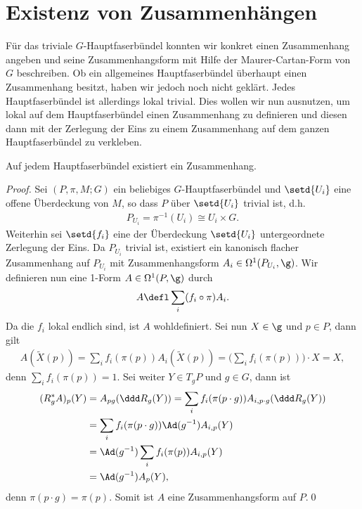 \documentclass[%
	paper=a5,%
	fleqn,%
	DIV=18,%
	BCOR=0mm,
	fontsize=11pt,
	titlepage=false,%
	bibliography=totoc,
	DIV=18,%
	twoside=true,
	pdftitle=Riemannsche Geometrie,
	pdfauthor=Uwe Semmelmann,
	numbers=noendperiod]%
	{scrbook}
\begin{document}
\section{Existenz von Zusammenhängen}

Für das triviale $G$-Hauptfaserbündel konnten wir konkret einen Zusammenhang
angeben und seine Zusammenhangsform mit Hilfe der Maurer-Cartan-Form von $G$
beschreiben. Ob ein allgemeines Hauptfaserbündel überhaupt einen Zusammenhang
besitzt, haben wir jedoch noch nicht geklärt. Jedes Hauptfaserbündel ist allerdings
lokal trivial. Dies wollen wir nun ausnutzen, um lokal auf dem
Hauptfaserbündel einen Zusammenhang zu definieren und diesen dann mit der
Zerlegung der Eins zu einem Zusammenhang auf dem ganzen Hauptfaserbündel zu
verkleben.

\begin{prop}
Auf jedem Hauptfaserbündel existiert ein Zusammenhang.\fish
\end{prop}
\begin{proof}
Sei $(P,\pi,M;G)$ ein beliebiges $G$-Hauptfaserbündel und $\setd{U_i}$ eine
offene Überdeckung von $M$, so dass $P$ über $\setd{U_i}$ trivial ist, d.h.
\begin{align*}
P_{U_i} = \pi^{-1}(U_i) \cong U_i \times G.
\end{align*}
Weiterhin sei $\setd{f_i}$ eine der Überdeckung $\setd{U_i}$ untergeordnete
Zerlegung der Eins. Da $P_{U_i}$ trivial ist, existiert ein kanonisch
flacher Zusammenhang auf $P_{U_i}$ mit Zusammenhangsform $A_i\in
\Omega^1(P_{U_i},\g)$. Wir definieren nun eine 1-Form $A\in\Omega^1(P,\g)$
durch
\begin{align*}
A\defl \sum_{i} (f_i\circ \pi) A_i.
\end{align*}
Da die $f_i$ lokal endlich sind, ist $A$ wohldefiniert. Sei nun $X\in\g$
und $p\in P$, dann gilt
\begin{align*}
A(\tilde{X}(p))
= \sum_i f_i(\pi(p)) A_i(\tilde{X}(p))
= \biggl(\sum_i f_i(\pi(p))\biggr)\cdot X
= X,
\end{align*}
denn $\sum_i f_i(\pi(p)) = 1$. Sei weiter $Y\in T_gP$ und $g\in G$, dann
ist
\begin{align*}
(R_g^* A)_p (Y) &= A_{pg}(\ddd R_g(Y))
= \sum_i f_i(\pi(p\cdot g)) A_{i,p\cdot g}(\ddd R_g(Y))\\
&= \sum_i f_i(\pi(p\cdot g)) \Ad(g^{-1})A_{i,p}(Y)\\
&= \Ad(g^{-1})\sum_i f_i(\pi(p)) A_{i,p}(Y)\\
&= \Ad(g^{-1})A_p(Y),
\end{align*}
denn $\pi(p\cdot g) = \pi(p)$. Somit ist $A$ eine Zusammenhangsform auf $P$.\qed
\end{proof}
\end{document}
